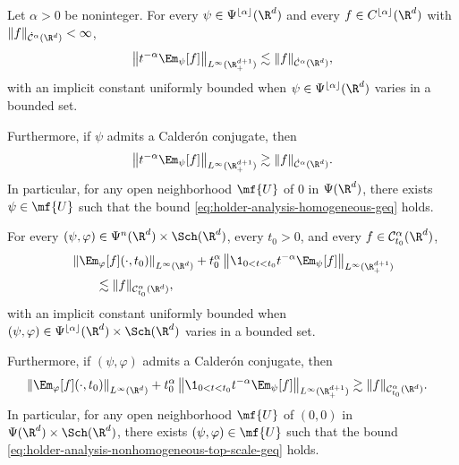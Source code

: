 \begin{theorem} \label{thm:holder-analysis} Let \(\alpha>0\) be noninteger.
For every \(\psi\in\Psi^{\lfloor\alpha\rfloor}(\R^d)\) and every \(f\in C^{\lfloor\alpha\rfloor}(\R^d)\) with \(\|f\|_{\dot{\mathcal{C}}^\alpha(\R^d)}<\infty\),
\begin{equation}
\label{eq:holder-analysis-homogeneous-leq}
\left\| t^{-\alpha}\Em_\psi[f]\right\|_{L^\infty(\R^{d+1}_+)}
\lesssim
\|f\|_{\dot{\mathcal{C}}^\alpha(\R^d)},
\end{equation}
with an implicit constant uniformly bounded when \(\psi\in\Psi^{\lfloor\alpha\rfloor}(\R^{d})\) varies in a bounded set.

Furthermore, if \(\psi\) admits a Calder\'on conjugate, then
\begin{equation}
\label{eq:holder-analysis-homogeneous-geq}
\left\| t^{-\alpha}\Em_\psi[f]\right\|_{L^\infty(\R^{d+1}_+)}
\gtrsim
\|f\|_{\dot{\mathcal{C}}^\alpha(\R^d)}.
\end{equation}
In particular, for any open neighborhood \(\mf{U}\) of \(0\) in \(\Psi(\R^{d})\), there exists \(\psi\in\mf{U}\) such that the bound \eqref{eq:holder-analysis-homogeneous-geq} holds.

For every \((\psi,\varphi)\in\Psi^n(\R^d)\times\Sch(\R^d)\), every \(t_0>0\), and every \(f\in\mathcal{C}^{\alpha}_{t_0}(\R^d)\),
\begin{equation}
\label{eq:holder-analysis-nonhomogeneous-top-scale-leq}
\begin{aligned}[t]
   & \left\|\Em_\varphi[f](\cdot,t_0)\right\|_{L^\infty(\R^d)}
  + t_0^\alpha
  \left\| \1_{0<t<t_0}t^{-\alpha}\Em_\psi[f] \right\|_{L^\infty(\R^{d+1}_+)}
  \\
   & \qquad\lesssim \|f\|_{\mathcal{C}^{\alpha}_{t_0}(\R^d)},
\end{aligned}
\end{equation}
with an implicit constant uniformly bounded when \((\psi,\varphi)\in\Psi^{\lfloor\alpha\rfloor}(\R^{d})\times\Sch(\R^{d})\) varies in a bounded set.

Furthermore, if \((\psi,\varphi)\) admits a Calder\'on conjugate, then
\begin{equation}
\label{eq:holder-analysis-nonhomogeneous-top-scale-geq}
\begin{aligned}[t]
   &
  \left\|\Em_\varphi[f](\cdot,t_0)\right\|_{L^\infty(\R^d)}
  +
  t_0^\alpha
  \left\|
  \1_{0<t<t_0}t^{-\alpha}\Em_\psi[f]
  \right\|_{L^\infty(\R^{d+1}_+)}
  \gtrsim
  \|f\|_{\mathcal{C}^{\alpha}_{t_0}(\R^d)}.
\end{aligned}
\end{equation}
In particular, for any open neighborhood \(\mf{U}\) of \((0,0)\) in \(\Psi(\R^{d})\times\Sch(\R^{d})\), there exists \((\psi,\varphi)\in\mf{U}\) such that the bound \eqref{eq:holder-analysis-nonhomogeneous-top-scale-geq} holds.
\end{theorem}


